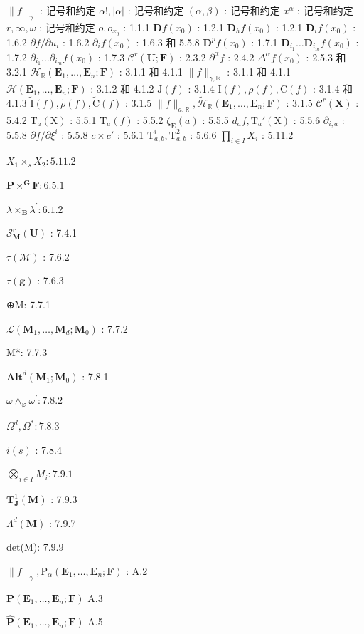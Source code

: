 
\(\| f \|_{\gamma}\) : 记号和约定 \(\alpha!, |\alpha|\) : 记号和约定 \((\alpha, \beta)\) : 记号和约定 \(x^{\alpha}\) : 记号和约定 \(r, \infty, \omega\) : 记号和约定 \(o, o_{x_0}\) : 1.1.1 \(\mathbf{D}f(x_0)\) : 1.2.1 \(\mathbf{D}_h f(x_0)\) : 1.2.1 \(\mathbf{D}_i f(x_0)\) : 1.6.2 \(\partial f / \partial u_i\) : 1.6.2 \(\partial_i f(x_0)\) : 1.6.3 和 5.5.8 \(\mathbf{D}^p f(x_0)\) : 1.7.1 \(\mathbf{D}_{i_1} \ldots \mathbf{D}_{i_m} f(x_0)\) : 1.7.2 \(\partial_{i_1} \ldots \partial_{i_m} f(x_0)\) : 1.7.3 \(\mathcal{C}^r (\mathbf{U};\mathbf{F})\) : 2.3.2 \(\partial^\alpha f\) : 2.4.2 \(\Delta^\alpha f(x_0)\) : 2.5.3 和 3.2.1 \(\mathcal{H}_{\mathbb{R}}(\mathbf{E}_1,\dots,\mathbf{E}_n;\mathbf{F})\) : 3.1.1 和 4.1.1 \(\| f \|_{\gamma,\mathbb{R}}\) : 3.1.1 和 4.1.1 \(\mathcal{H}(\mathbf{E}_1,\dots,\mathbf{E}_n;\mathbf{F})\) : 3.1.2 和 4.1.2 \(\mathrm{J}(f)\) : 3.1.4 \(\mathrm{I}(f), \rho(f), \mathrm{C}(f)\) : 3.1.4 和 4.1.3 \(\tilde{\mathrm{I}}(f), \tilde{\rho}(f), \tilde{\mathrm{C}}(f)\) : 3.1.5 \(\| f \|_{a,\mathbb{R}}, \tilde{\mathcal{H}}_{\mathbb{R}}(\mathbf{E}_1,\dots,\mathbf{E}_n;\mathbf{F})\) : 3.1.5 \(\mathcal{C}^r (\mathbf{X})\) : 5.4.2 \(\mathrm{T}_a(\mathrm{X})\) : 5.5.1 \(\mathrm{T}_a(f)\) : 5.5.2 \(\zeta_{\mathrm{E}}(a)\) : 5.5.5 \(d_a f, \mathrm{T}_a'(\mathrm{X})\) : 5.5.6 \(\partial_{i,a}\) : 5.5.8 \(\partial f / \partial\xi^i\) : 5.5.8 \(c \times c'\) : 5.6.1 \(\mathrm{T}_{a,b}^i, \mathrm{T}_{a,b}^2\) : 5.6.6 \(\prod_{i \in I} X_i\) : 5.11.2

\(X_{1} \times_{s} X_{2}: 5.11.2\)

\(\mathbf{P} \times^{\mathbf{G}} \mathbf{F}: 6.5.1\)

\(\lambda \times_{\mathbf{B}}\lambda^{\prime}:6.1.2\)

\(\mathcal{S}_{\mathbf{M}}^{\boldsymbol{r}}(\mathbf{U})\) : 7.4.1

\(\tau (\mathcal{M})\) : 7.6.2

\(\tau (\mathbf{g})\) : 7.6.3

⊕M: 7.7.1

\(\mathcal{L}(\mathbf{M}_1,\dots ,\mathbf{M}_d;\mathbf{M}_0)\) : 7.7.2

M*: 7.7.3

\(\mathbf{Alt}^d (\mathbf{M}_1;\mathbf{M}_0)\) : 7.8.1

\(\omega \wedge_{\varphi}\omega^{\prime}:7.8.2\)

\(\Omega^d,\Omega^* :7.8.3\)

\(i(s)\) : 7.8.4

\(\bigotimes_{i \in I} M_i: 7.9.1\)

\(\mathbf{T}_{\mathbf{J}}^{1}(\mathbf{M})\) : 7.9.3

\(\Lambda^{d}(\mathbf{M})\) : 7.9.7

det(M): 7.9.9

\(\| f\|_{\gamma},\mathrm{P}_{\alpha}(\mathbf{E}_1,\dots ,\mathbf{E}_n;\mathbf{F})\) : A.2

\(\mathbf{P}(\mathbf{E}_1,\dots ,\mathbf{E}_n;\mathbf{F})\) A.3

\(\hat{\mathbf{P}} (\mathbf{E}_1,\dots ,\mathbf{E}_n;\mathbf{F})\) A.5

